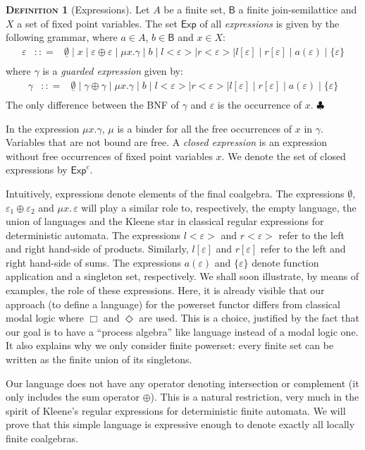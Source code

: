 \documentclass{LMCS}
\newcommand\E\varepsilon
\newcommand\Exp{\mathsf{Exp}}
\newcommand\B{\mathsf{B}}
\newcommand\emp{\underline\emptyset}
\def\hyph{-\penalty0\hskip0pt\relax}
\theoremstyle{definition}
\newtheorem{mydefinition}{\textsc{Definition}}[section]
\theoremstyle{plain}
\theoremstyle{plain}
\theoremstyle{plain}
\theoremstyle{plain}
\theoremstyle{definition}
\theoremstyle{definition}
\newenvironment{definition}{
\begin{mydefinition}}
    {\hfill$\clubsuit$\end{mydefinition}}
\begin{document}
\begin{definition}[Expressions]
Let $A$ be a finite set, $\B$ a finite join\hyph semilattice and $X$ a set
of fixed point variables. The set $\Exp$ of all {\em expressions\/} is given
by the following grammar, where $a\in A$, $b\in \B$ and $x\in X$:
\[
\begin{array}{lcl}
\E &:: =& \emp \mid x \mid \E \oplus \E \mid \mu x.\gamma
    \mid b \mid l<\E> \mid r<\E> \mid l[\E] \mid r[\E] \mid a(\E) \mid
\{\E\}\\
\end{array}
\]
where $\gamma$ is a {\em guarded expression} given by:
\[
\begin{array}{lcl}
\gamma &:: =& \emp \mid \gamma \oplus \gamma \mid \mu
x.\gamma
    \mid b \mid l<\E> \mid r<\E> \mid l[\E] \mid r[\E] \mid a(\E) \mid
\{\E\}\\
\end{array}
\]
The only difference between the BNF of $\gamma$ and $\E$ is the
occurrence of $x$.
\end{definition}
 In the expression $\mu x.\gamma$, $\mu$ is a binder for
all the free occurrences of $x$ in $\gamma$. Variables that are not bound are
free. A {\em closed expression} is an expression
without free occurrences of fixed point variables $x$. We denote the set of closed
expressions by $\Exp^c$. 

Intuitively, expressions denote elements of the final coalgebra. The
expressions $\emp$, $\E_1\oplus \E_2$ and  $\mu x.\, \E$ will
play a similar role to, respectively, the empty language, the union
of languages and the Kleene star in classical regular expressions
for deterministic automata. The expressions $l<\E>$ and $r<\E>$ refer to the left and right hand-side
of products. Similarly, $l[\E]$ and $r[\E]$ refer to the left and right hand-side
of sums. The expressions $a(\E)$ and $\{\E\}$ denote function application and a singleton set, respectively. We shall soon
illustrate, by means of examples, the role of these expressions. Here,
it is already visible that our approach (to define a language) for the
powerset functor differs from classical modal logic where $\Box$ and
$\Diamond$ are used. 
 This is a choice, justified by the fact that our goal is to have a ``process algebra'' like 
language instead of a modal logic one. It also explains why we only consider finite powerset: 
every finite set can be written as the finite union of its singletons.


Our language does not have any operator denoting intersection or
complement (it only includes the sum operator $\oplus$). This is a
natural restriction, very much in the spirit of Kleene's regular
expressions for deterministic finite automata. We
will prove that this simple language is expressive enough to denote
exactly all locally finite coalgebras.
\end{document}

